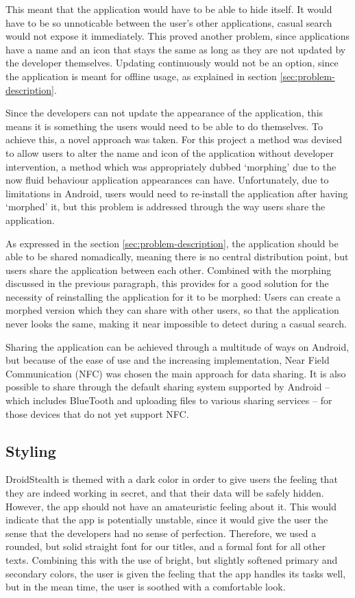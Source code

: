 This meant that the application would have to be able to hide itself.
It would have to be so unnoticable between the user's other applications, casual search would not expose it immediately. 
This proved another problem, since applications have a name and an icon that stays the same as long as they are not updated by the developer themselves. 
Updating continuously would not be an option, since the application is meant for offline usage, as explained in section \ref{sec:problem-description}. 

Since the developers can not update the appearance of the application, this means it is something the users would need to be able to do themselves.
To achieve this, a novel approach was taken.
For this project a method was devised to allow users to alter the name and icon of the application without developer intervention, a method which was appropriately dubbed `morphing' due to the now fluid behaviour application appearances can have.
Unfortunately, due to limitations in Android, users would need to re-install the application after having `morphed' it, but this problem is addressed through the way users share the application.

As expressed in the section \ref{sec:problem-description}, the application should be able to be shared nomadically, meaning there is no central distribution point, but users share the application between each other. 
Combined with the morphing discussed in the previous paragraph, this provides for a good solution for the necessity of reinstalling the application for it to be morphed: 
Users can create a morphed version which they can share with other users, so that the application never looks the same, making it near impossible to detect during a casual search.

Sharing the application can be achieved through a multitude of ways on Android, but because of the ease of use and the increasing implementation, Near Field Communication (NFC)\cite{website:nfc-spec} was chosen the main approach for data sharing. 
It is also possible to share through the default sharing system supported by Android -- which includes BlueTooth and uploading files to various sharing services -- for those devices that do not yet support NFC.

\subsection{Styling}

DroidStealth is themed with a dark color in order to give users the feeling that they are indeed
working in secret, and that their data will be safely hidden. However, the app should not
have an amateuristic feeling about it. This would indicate that the app is potentially unstable, 
since it would give the user the sense that the developers had no sense of perfection. 
Therefore, we used a rounded, but solid straight font for our titles, and a formal font for 
all other texts. Combining this with the use of bright, but slightly softened primary and 
secondary colors, the user is given the feeling that the app handles its tasks well, but in 
the mean time, the user is soothed with a comfortable look. %

